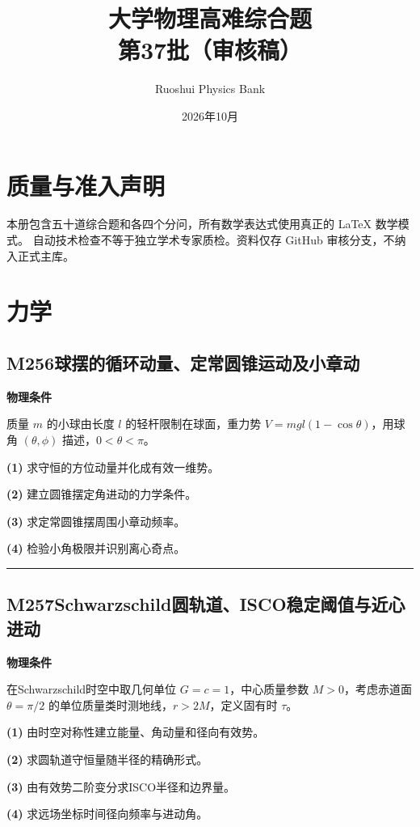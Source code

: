 \documentclass[UTF8,a4paper,11pt,oneside,openany]{ctexbook}
\begin{document}
\title{\textcolor{accent}{大学物理高难综合题}\\\Large 第37批（审核稿）}
\author{Ruoshui Physics Bank}
\date{2026年10月}
\maketitle
\tableofcontents
\chapter*{质量与准入声明}
本册包含五十道综合题和各四个分问，所有数学表达式使用真正的 \LaTeX{} 数学模式。
自动技术检查不等于独立学术专家质检。资料仅存 GitHub 审核分支，不纳入正式主库。

\chapter{力学}
\section*{M256\quad 球摆的循环动量、定常圆锥运动及小章动}
\textbf{物理条件}\par 质量 \(m\) 的小球由长度 \(l\) 的轻杆限制在球面，重力势 \(V=mgl(1-\cos\theta)\)，用球角 \((\theta,\phi)\) 描述，\(0<\theta<\pi\)。
\par\noindent\textbf{(1)} 求守恒的方位动量并化成有效一维势。
\par\noindent\textbf{(2)} 建立圆锥摆定角进动的力学条件。
\par\noindent\textbf{(3)} 求定常圆锥摆周围小章动频率。
\par\noindent\textbf{(4)} 检验小角极限并识别离心奇点。

\par\bigskip\hrule\bigskip
\section*{M257\quad Schwarzschild圆轨道、ISCO稳定阈值与近心进动}
\textbf{物理条件}\par 在Schwarzschild时空中取几何单位 \(G=c=1\)，中心质量参数 \(M>0\)，考虑赤道面 \(\theta=\pi/2\) 的单位质量类时测地线，\(r>2M\)，定义固有时 \(\tau\)。
\par\noindent\textbf{(1)} 由时空对称性建立能量、角动量和径向有效势。
\par\noindent\textbf{(2)} 求圆轨道守恒量随半径的精确形式。
\par\noindent\textbf{(3)} 由有效势二阶变分求ISCO半径和边界量。
\par\noindent\textbf{(4)} 求远场坐标时间径向频率与进动角。
\end{document}
